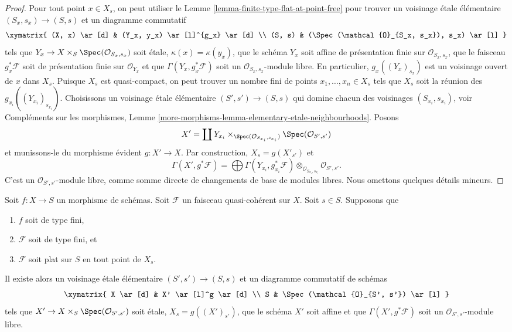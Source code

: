 \begin{proof}
Pour tout point $x \in X_s$, on peut utiliser le
Lemme \ref{lemma-finite-type-flat-at-point-free}
pour trouver un voisinage \'etale élémentaire $(S_x , s_x) \to (S, s)$
et un diagramme commutatif
$$
\xymatrix{
(X, x) \ar[d] & (Y_x, y_x) \ar[l]^{g_x} \ar[d] \\
(S, s) & (\Spec(\mathcal{O}_{S_x, s_x}), s_x) \ar[l]
}
$$
tels que $Y_x \to X \times_S \Spec(\mathcal{O}_{S_x, s_x})$
soit \'etale, $\kappa(x) = \kappa(y_x)$, que le schéma $Y_x$ soit affine
de présentation finie sur $\mathcal{O}_{S_x, s_x}$, que le faisceau
$g_x^*\mathcal{F}$ soit de présentation finie sur $\mathcal{O}_{Y_x}$ et
que $\Gamma(Y_x, g_x^*\mathcal{F})$ soit un
$\mathcal{O}_{S_x, s_x}$-module libre. En particulier,
$g_x((Y_x)_{s_x})$ est un voisinage ouvert de $x$ dans $X_s$.
Puisque $X_s$ est quasi-compact, on peut trouver un nombre fini de points
$x_1, \ldots, x_n \in X_s$ tels que $X_s$ soit la réunion
des $g_{x_i}((Y_{x_i})_{s_{x_i}})$. Choisissons un voisinage \'etale élémentaire
$(S' , s') \to (S, s)$ qui domine chacun des voisinages
$(S_{x_i}, s_{x_i})$, voir
Compléments sur les morphismes,
Lemme \ref{more-morphisms-lemma-elementary-etale-neighbourhoods}.
Posons
$$
X' = \coprod Y_{x_i} \times_{\Spec(\mathcal{O}_{S_{x_i}, s_{x_i}})}
\Spec(\mathcal{O}_{S', s'})
$$
et munissons-le du morphisme évident $g : X' \to X$.
Par construction, $X_s = g(X'_{s'})$ et
$$
\Gamma(X', g^*\mathcal{F})
=
\bigoplus \Gamma(Y_{x_i}, g_{x_i}^*\mathcal{F})
\otimes_{\mathcal{O}_{S_{x_i}, s_{x_i}}}
\mathcal{O}_{S', s'}.
$$
C'est un $\mathcal{O}_{S', s'}$-module libre, comme somme directe
de changements de base de modules libres. Nous omettons quelques détails mineurs.
\end{proof}

\begin{lemma}
\label{lemma-finite-type-flat-along-fibre-free-variant}
Soit $f : X \to S$ un morphisme de schémas.
Soit $\mathcal{F}$ un faisceau quasi-cohérent sur $X$.
Soit $s \in S$.
Supposons que
\begin{enumerate}
\item $f$ soit de type fini,
\item $\mathcal{F}$ soit de type fini, et
\item $\mathcal{F}$ soit plat sur $S$ en tout point de $X_s$.
\end{enumerate}
Il existe alors un voisinage \'etale élémentaire $(S', s') \to (S, s)$
et un diagramme commutatif de schémas
$$
\xymatrix{
X \ar[d] & X' \ar[l]^g \ar[d] \\
S & \Spec(\mathcal{O}_{S', s'}) \ar[l]
}
$$
tels que $X' \to X \times_S \Spec(\mathcal{O}_{S', s'})$
soit \'etale, $X_s = g((X')_{s'})$, que le schéma $X'$ soit affine
et que $\Gamma(X', g^*\mathcal{F})$ soit un
$\mathcal{O}_{S', s'}$-module libre.
\end{lemma}

